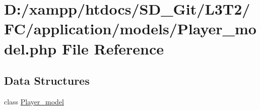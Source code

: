 \hypertarget{application_2models_2_player__model_8php}{}\section{D\+:/xampp/htdocs/\+S\+D\+\_\+\+Git/\+L3\+T2/\+F\+C/application/models/\+Player\+\_\+model.php File Reference}
\label{application_2models_2_player__model_8php}
\subsection*{Data Structures}
\begin{DoxyCompactItemize}
\item 
class \hyperlink{class_player__model}{Player\+\_\+model}
\end{DoxyCompactItemize}

